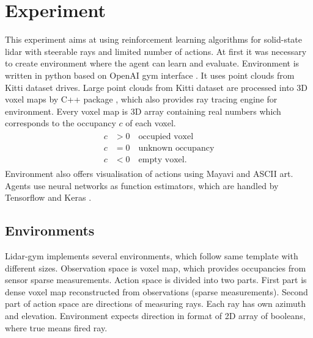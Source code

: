 \section{Experiment}
This experiment aims at using reinforcement learning algorithms for solid-state lidar with steerable rays and limited number of actions. At first it was necessary to create environment where the agent can learn and evaluate\cite{rozsypalek2018}. Environment is written in python based on OpenAI gym interface \cite{openai2016}. It uses point clouds from Kitti dataset drives\cite{geiger2013}. Large point clouds from Kitti dataset are processed into 3D voxel maps by C++ package \cite{petricek2017}, which also provides ray tracing engine for environment. Every voxel map is 3D array containing real numbers which corresponds to the occupancy $c$ of each voxel.
\begin{align}
\begin{split}
c &> 0 \quad \text{occupied voxel} \\
c &= 0 \quad \text{unknown occupancy} \\
c &< 0 \quad \text{empty voxel.}
\end{split}
\end{align}
Environment also offers visualisation of actions using Mayavi \cite{mayavi2011} and ASCII art. Agents use neural networks as function estimators, which are handled by Tensorflow \cite{tensorflow2015} and Keras \cite{keras2015}.

\subsection{Environments}
Lidar-gym implements several environments, which follow same template with different sizes. Observation space is voxel map, which provides occupancies from sensor sparse measurements. Action space is divided into two parts. First part is dense voxel map reconstructed from observations (sparse measurements). Second part of action space are directions of measuring rays. Each ray has own azimuth and elevation. Environment expects direction in format of 2D array of booleans, where true means fired ray.

